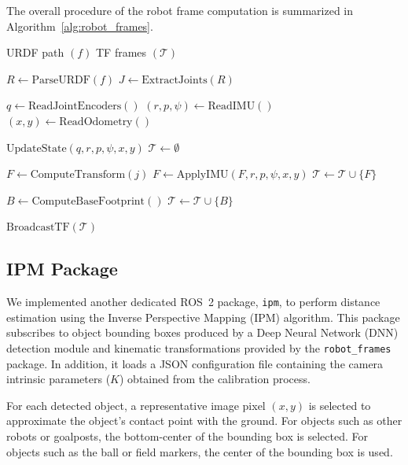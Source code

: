 \documentclass[journal]{IAENGtran}
\begin{document}
The overall procedure of the robot frame computation is summarized
in Algorithm~\ref{alg:robot_frames}.

\begin{algorithm}[!h]
\caption{Robot Frames Package}
\label{alg:robot_frames}
\footnotesize
\begin{algorithmic}[1]
\Require URDF path $(f)$
\Ensure TF frames $(\mathcal{T})$

\State $R \gets \text{ParseURDF}(f)$
\State $J \gets \text{ExtractJoints}(R)$

    \State $q \gets \text{ReadJointEncoders}()$
    \State $(r,p,\psi) \gets \text{ReadIMU}()$
    \State $(x,y) \gets \text{ReadOdometry}()$

    \State $\text{UpdateState}(q, r,p,\psi, x,y)$
    \State $\mathcal{T} \gets \emptyset$

        \State $F \gets \text{ComputeTransform}(j)$
            \State $F \gets \text{ApplyIMU}(F, r,p,\psi, x,y)$
        \EndIf
        \State $\mathcal{T} \gets \mathcal{T} \cup \{F\}$
    \EndFor

    \State $B \gets \text{ComputeBaseFootprint}()$
    \State $\mathcal{T} \gets \mathcal{T} \cup \{B\}$

    \State $\text{BroadcastTF}(\mathcal{T})$
\EndWhile

\end{algorithmic}
\end{algorithm}

\subsection{IPM Package}

We implemented another dedicated ROS~2 package, \texttt{ipm}, to perform distance estimation using
the Inverse Perspective Mapping (IPM) algorithm. This package subscribes to object bounding boxes
produced by a Deep Neural Network (DNN) detection module and kinematic transformations provided by
the \texttt{robot\_frames} package. In addition, it loads a JSON configuration file containing the
camera intrinsic parameters ($K$) obtained from the calibration process.

For each detected object, a representative image pixel $(x, y)$ is selected to approximate the
object's contact point with the ground. For objects such as other robots or goalposts, the
bottom-center of the bounding box is selected. For objects such as the ball or field markers,
the center of the bounding box is used.
\end{document}
